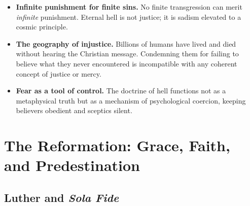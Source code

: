 \documentclass[11pt,twoside]{article}
\begin{document}
\begin{scheda}

\begin{itemize}
  \item \textbf{Infinite punishment for finite sins.}
    No finite transgression can merit \emph{infinite} punishment.
    Eternal hell is not justice; it is sadism elevated to a cosmic principle.
  \item \textbf{The geography of injustice.}
    Billions of humans have lived and died without hearing the Christian
    message.  Condemning them for failing to believe what they never
    encountered is incompatible with any coherent concept of justice or
    mercy.
  \item \textbf{Fear as a tool of control.}
    The doctrine of hell functions not as a metaphysical truth but as a
    mechanism of psychological coercion, keeping believers obedient and
    sceptics silent.
\end{itemize}
\end{scheda}

\newpage

\section{The Reformation: Grace, Faith, and Predestination}

\subsection{Luther and \textit{Sola Fide}}
\end{document}
